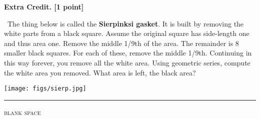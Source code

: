 \documentclass[12pt]{article}
\renewcommand{\emph}[1]{\textsf{\textbf{#1}}}
\begin{document}
\clearpage\newpage
\textbf{\textsf{Extra Credit. [1 point]}} {\large\strut} \, \quad The thing below is called the \emph{Sierpinksi gasket}.  It is built by removing the white parts from a black square.  Assume the original square has side-length one and thus area one.  Remove the middle 1/9th of the area.  The remainder is 8 smaller black squares.  For each of these, remove the middle 1/9th.  Continuing in this way forever, you remove all the white area.  Using geometric series, compute the white area you removed.  What area is left, the black area?

\bigskip
\texttt{[image: figs/sierp.jpg]}
\vspace{2.5in}

\noindent \hrule
\medskip
\centerline{\footnotesize \textsc{blank space}}
\vfill
\end{document}
